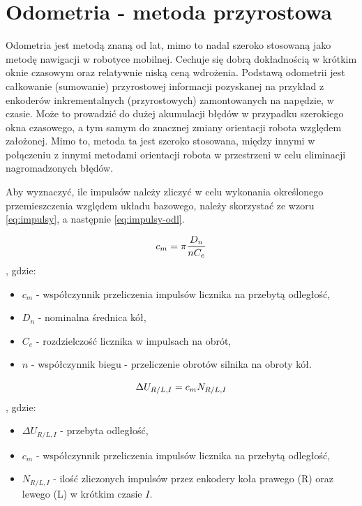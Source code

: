 \section{Odometria - metoda przyrostowa}

Odometria jest metodą znaną od lat, mimo to nadal szeroko stosowaną jako metodę nawigacji w robotyce mobilnej. Cechuje się dobrą dokładnością w krótkim oknie czasowym oraz relatywnie niską ceną wdrożenia. Podstawą odometrii jest całkowanie (sumowanie) przyrostowej informacji pozyskanej na przykład z enkoderów inkrementalnych (przyrostowych) zamontowanych na napędzie, w czasie. Może to prowadzić do dużej akumulacji błędów w przypadku szerokiego okna czasowego, a tym samym do znacznej zmiany orientacji robota względem założonej. Mimo to, metoda ta jest szeroko stosowana, między innymi w połączeniu z innymi metodami orientacji  robota w przestrzeni w celu eliminacji nagromadzonych błędów. 

\hspace{1cm}

Aby wyznaczyć, ile impulsów należy zliczyć w celu wykonania określonego przemieszczenia względem układu bazowego, należy skorzystać ze wzoru \ref{eq:impulsy}, a następnie \ref{eq:impulsy-odl}.

\begin{equation}
    \centering
    c_m = \pi \frac{D_n}{n C_e}
    \label{eq:impulsy}
\end{equation}
, gdzie:
\begin{itemize}
    \item \(c_m\) - współczynnik przeliczenia impulsów licznika na przebytą odległość,
    \item \(D_n\) - nominalna średnica kół,
    \item \(C_e\) - rozdzielczość licznika w impulsach na obrót,
    \item \(n\) - współczynnik biegu - przeliczenie obrotów silnika na obroty kół.
\end{itemize}

\begin{equation}
    \centering
    \Delta U_{R/L, I} = c_m N_{R/L, I}
    \label{eq:impulsy-odl}
\end{equation}
, gdzie:
\begin{itemize}
    \item \(\Delta U_{R/L, I}\) - przebyta odległość,
    \item \(c_m\) -  współczynnik przeliczenia impulsów licznika na przebytą odległość,
    \item \(N_{R/L, I}\) - ilość zliczonych impulsów przez enkodery koła prawego (R) oraz lewego (L) w krótkim czasie \(I\). 
\end{itemize}

